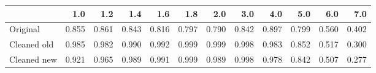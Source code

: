 \begin{tabular}{lrrrrrrrrrrr}
\toprule
{} &   1.0 &   1.2 &   1.4 &   1.6 &   1.8 &   2.0 &   3.0 &   4.0 &   5.0 &   6.0 &   7.0 \\
\midrule
Original    & 0.855 & 0.861 & 0.843 & 0.816 & 0.797 & 0.790 & 0.842 & 0.897 & 0.799 & 0.560 & 0.402 \\
Cleaned old & 0.985 & 0.982 & 0.990 & 0.992 & 0.999 & 0.999 & 0.998 & 0.983 & 0.852 & 0.517 & 0.300 \\
Cleaned new & 0.921 & 0.965 & 0.989 & 0.991 & 0.999 & 0.989 & 0.998 & 0.978 & 0.842 & 0.507 & 0.277 \\
\bottomrule
\end{tabular}
